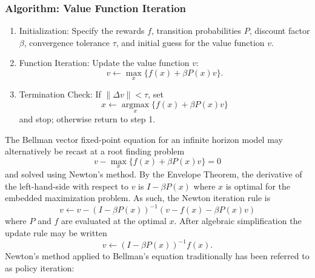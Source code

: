 \documentclass[\topdir/lecture\_notes.tex]{subfiles}
\begin{document}
\subsubsection{Algorithm: Value Function Iteration}
\begin{enumerate}
  \item Initialization: Specify the rewards $f$, transition probabilities $P$, discount factor $\beta$, convergence tolerance $\tau$, and initial guess for the value function $v$.

  \item Function Iteration: Update the value function $v$:
    \begin{equation*}
    v \leftarrow \max _{x}\{f(x)+\beta P(x) v\} .
    \end{equation*}
  \item Termination Check: If $\|\Delta v\|<\tau$, set
    \begin{equation*}
    x \leftarrow \underset{x}{\operatorname{argmax}}\{f(x)+\beta P(x) v\}
    \end{equation*}
and stop; otherwise return to step 1.
\end{enumerate}

The Bellman vector fixed-point equation for an infinite horizon model may alternatively be recast at a root finding problem
\begin{equation*}
v-\max _{x}\{f(x)+\beta P(x) v\}=0
\end{equation*}
and solved using Newton's method. By the Envelope Theorem, the derivative of the left-hand-side with respect to $v$ is $I-\beta P(x)$ where $x$ is optimal for the embedded maximization problem. As such, the Newton iteration rule is
\begin{equation*}
v \leftarrow v-(I-\beta P(x))^{-1}(v-f(x)-\beta P(x) v)
\end{equation*}
where $P$ and $f$ are evaluated at the optimal $x$. After algebraic simplification the update rule may be written
\begin{equation*}
v \leftarrow(I-\beta P(x))^{-1} f(x) .
\end{equation*}
Newton's method applied to Bellman's equation traditionally has been referred to as policy iteration:
\end{document}
